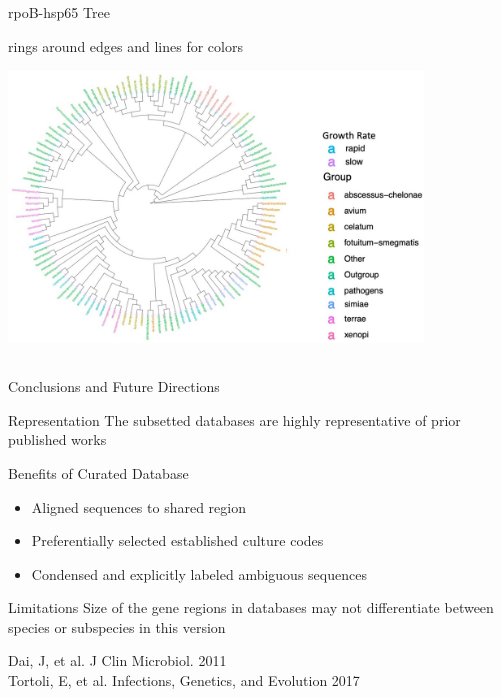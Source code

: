 \documentclass[11pt, xcolor=table]{beamer}
\begin{document}
	\begin{frame}{rpoB-hsp65 Tree}
	
	rings around edges and lines for colors
	\includegraphics[height=8cm, width=11cm]{CPBS_11_18/Tree2.jpg}
	\end{frame}

	\begin{frame}{Conclusions and Future Directions}
	
	\begin{block}{Representation}
	The subsetted databases are highly representative of prior published works
	\end{block}
	
	\begin{block}{Benefits of Curated Database}
	\begin{itemize}
	\item Aligned sequences to shared region
	\item Preferentially selected established culture codes
	\item Condensed and explicitly labeled ambiguous sequences 
  \end{itemize}
	\end{block}
	
	\begin{block}{Limitations}
	Size of the gene regions in databases may not differentiate between species or subspecies in this version
	\end{block}
	
	\tiny{Dai, J, et al. J Clin Microbiol. 2011 \\ Tortoli, E, et al. Infections, Genetics, and Evolution 2017}
  \end{frame}
\end{document}
